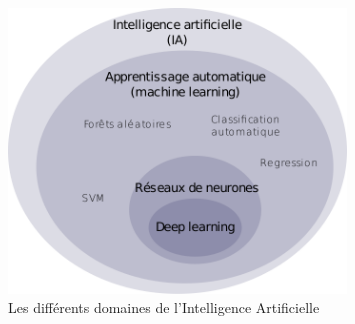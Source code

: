 \begin{figure}[!h]
    \centering
    \includegraphics[width=0.8\textwidth]{Images/aitype}
    \caption{Les différents domaines de l'Intelligence Artificielle}
	\label{fig:categorieIA}
\end{figure}


